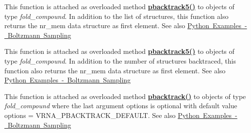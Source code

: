 \begin{DoxyRefList}
\item[Global \mbox{\hyperlink{group__subopt__stochbt_gac5d7065196975b803daeb4e094ba1cb9}{vrna\+\_\+pbacktrack5\+\_\+resume}} (vrna\+\_\+fold\+\_\+compound\+\_\+t $\ast$vc, unsigned int num\+\_\+samples, unsigned int length, vrna\+\_\+pbacktrack\+\_\+mem\+\_\+t $\ast$nr\+\_\+mem, unsigned int options)]\label{wrappers__wrappers000011}%
%
 This function is attached as overloaded method {\bfseries{\mbox{\hyperlink{group__subopt__stochbt__deprecated_gaf2e614b8beb4ddf3e8751433b76f39db}{pbacktrack5()}}}} to objects of type {\itshape fold\+\_\+compound}. In addition to the list of structures, this function also returns the {\ttfamily nr\+\_\+mem} data structure as first element. See also \mbox{\hyperlink{examples_python_examples_python_pbacktrack}{Python Examples -\/ Boltzmann Sampling}}  
\item[Global \mbox{\hyperlink{group__subopt__stochbt_ga4a91dc092580faf7799476e8dd76e0ac}{vrna\+\_\+pbacktrack5\+\_\+resume\+\_\+cb}} (vrna\+\_\+fold\+\_\+compound\+\_\+t $\ast$fc, unsigned int num\+\_\+samples, unsigned int length, vrna\+\_\+boltzmann\+\_\+sampling\+\_\+callback $\ast$cb, void $\ast$data, vrna\+\_\+pbacktrack\+\_\+mem\+\_\+t $\ast$nr\+\_\+mem, unsigned int options)]\label{wrappers__wrappers000013}%
%
 This function is attached as overloaded method {\bfseries{\mbox{\hyperlink{group__subopt__stochbt__deprecated_gaf2e614b8beb4ddf3e8751433b76f39db}{pbacktrack5()}}}} to objects of type {\itshape fold\+\_\+compound}. In addition to the number of structures backtraced, this function also returns the {\ttfamily nr\+\_\+mem} data structure as first element. See also \mbox{\hyperlink{examples_python_examples_python_pbacktrack}{Python Examples -\/ Boltzmann Sampling}}  
\item[Global \mbox{\hyperlink{group__subopt__stochbt_ga843fa953a15337b15cc68401adad84d7}{vrna\+\_\+pbacktrack\+\_\+cb}} (vrna\+\_\+fold\+\_\+compound\+\_\+t $\ast$fc, unsigned int num\+\_\+samples, vrna\+\_\+boltzmann\+\_\+sampling\+\_\+callback $\ast$cb, void $\ast$data, unsigned int options)]\label{wrappers__wrappers000010}%
%
 This function is attached as overloaded method {\bfseries{\mbox{\hyperlink{group__subopt__stochbt__deprecated_gac03ca6db186bb3bf0a2a326d7fb3ba03}{pbacktrack()}}}} to objects of type {\itshape fold\+\_\+compound} where the last argument {\ttfamily options} is optional with default value {\ttfamily options = V\+R\+N\+A\+\_\+\+P\+B\+A\+C\+K\+T\+R\+A\+C\+K\+\_\+\+D\+E\+F\+A\+U\+LT}. See also \mbox{\hyperlink{examples_python_examples_python_pbacktrack}{Python Examples -\/ Boltzmann Sampling}}  

\end{DoxyRefList}

